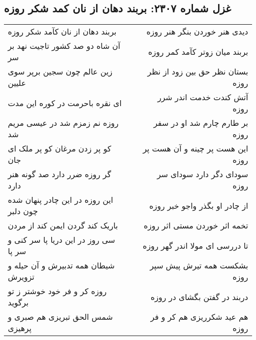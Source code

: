 \begin{center}
\section*{غزل شماره ۲۳۰۷: بربند دهان از نان کمد شکر روزه}
\label{sec:2307}
\begin{longtable}{l p{0.5cm} r}
بربند دهان از نان کآمد شکر روزه
&&
دیدی هنر خوردن بنگر هنر روزه
\\
آن شاه دو صد کشور تاجیت نهد بر سر
&&
بربند میان زوتر کآمد کمر روزه
\\
زین عالم چون سجین برپر سوی علیین
&&
بستان نظر حق بین زود از نظر روزه
\\
ای نقره باحرمت در کوره این مدت
&&
آتش کندت خدمت اندر شرر روزه
\\
روزه نم زمزم شد در عیسی مریم شد
&&
بر طارم چارم شد او در سفر روزه
\\
کو پر زدن مرغان کو پر ملک ای جان
&&
این هست پر چینه و آن هست پر روزه
\\
گر روزه ضرر دارد صد گونه هنر دارد
&&
سودای دگر دارد سودای سر روزه
\\
این روزه در این چادر پنهان شده چون دلبر
&&
از چادر او بگذر واجو خبر روزه
\\
باریک کند گردن ایمن کند از مردن
&&
تخمه اثر خوردن مستی اثر روزه
\\
سی روز در این دریا پا سر کنی و سر پا
&&
تا دررسی ای مولا اندر گهر روزه
\\
شیطان همه تدبیرش و آن حیله و تزویرش
&&
بشکست همه تیرش پیش سپر روزه
\\
روزه کر و فر خود خوشتر ز تو برگوید
&&
دربند در گفتن بگشای در روزه
\\
شمس الحق تبریزی هم صبری و پرهیزی
&&
هم عید شکرریزی هم کر و فر روزه
\\
\end{longtable}
\end{center}
